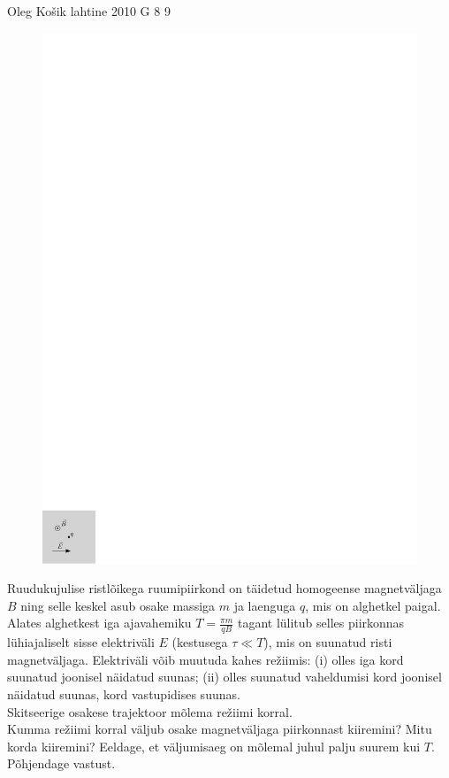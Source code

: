 \documentclass[11pt, twoside]{article}
\begin{document}
{%
{Oleg Košik} %
{lahtine} %
{2010} %
{G 8} %
{9} %
{
\ifStatement
\begin{figure}
	\vspace{-2.5ex}
	\includegraphics[width=\linewidth]{2010-lahg-08-laengu_joonis_ipe}
	\vspace{-6ex}
\end{figure}
Ruudukujulise ristlõikega ruumipiirkond on täidetud homogeense magnetväljaga
$B$ ning selle keskel asub osake massiga $m$ ja laenguga $q$, mis on alghetkel
paigal. Alates alghetkest iga ajavahemiku $T=\frac{\pi m}{qB}$ tagant lülitub
selles piirkonnas lühiajaliselt sisse elektriväli $E$ (kestusega $\tau \ll T$), mis
on suunatud risti magnetväljaga. Elektriväli võib muutuda kahes
režiimis: (i) olles iga kord suunatud joonisel näidatud suunas; (ii)
olles suunatud vaheldumisi kord joonisel näidatud suunas, kord vastupidises
suunas.\\
\osa Skitseerige osakese trajektoor mõlema režiimi korral.\\
\osa Kumma
režiimi korral väljub osake magnetväljaga piirkonnast kiiremini? Mitu korda
kiiremini?
Eeldage, et väljumisaeg on mõlemal juhul palju suurem kui $T$. Põhjendage vastust.
\fi
}

}
\end{document}
